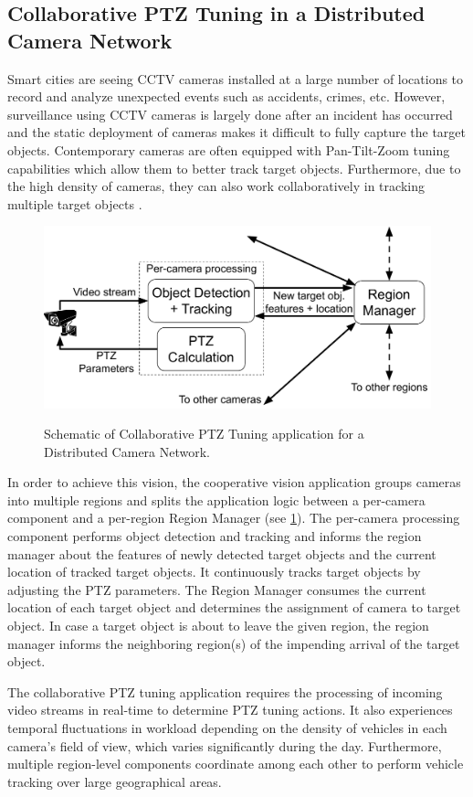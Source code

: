 \subsection{Collaborative PTZ Tuning in a Distributed Camera Network}
Smart cities are seeing CCTV cameras installed at a large number of locations to record and analyze unexpected events such as accidents, crimes, etc. However, surveillance using CCTV cameras is largely done after an incident has occurred and the static deployment of cameras makes it difficult to fully capture the target objects. Contemporary cameras are often equipped with Pan-Tilt-Zoom tuning capabilities which allow them to better track target objects. Furthermore, due to the high density of cameras, they can also work collaboratively in tracking multiple target objects \cite{matsuyama2002real}.
\begin{figure}[h]
\centering
\includegraphics[width=0.75\columnwidth]{figures/apps/multi_cam_ptz}
\label{fig:multi_cam_ptz_app}
\caption{Schematic of Collaborative PTZ Tuning application for a Distributed Camera Network.}
\end{figure}
\par In order to achieve this vision, the cooperative vision application groups cameras into multiple regions and splits the application logic between a per-camera component and a per-region Region Manager (see \cref{fig:multi_cam_ptz_app}). The per-camera processing component performs object detection and tracking and informs the region manager about the features of newly detected target objects and the current location of tracked target objects. It continuously tracks target objects by adjusting the PTZ parameters. The Region Manager consumes the current location of each target object and determines the assignment of camera to target object. In case a target object is about to leave the given region, the region manager informs the neighboring region(s) of the impending arrival of the target object.
\par The collaborative PTZ tuning application requires the processing of incoming video streams in real-time to determine PTZ tuning actions. It also experiences temporal fluctuations in workload depending on the density of vehicles in each camera's field of view, which varies significantly during the day. Furthermore, multiple region-level components coordinate among each other to perform vehicle tracking over large geographical areas.

